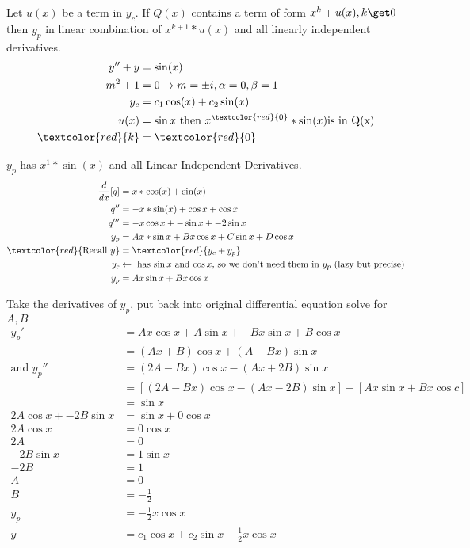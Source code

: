 \begin{case}
Let $u(x)$ be a term in $y_c$. If $Q(x)$ contains a term of form $x^k+u(x), k\get 0$ then $y_p$ in linear combination of $x^{k+1} * u(x)$ and all linearly independent derivatives.
\begin{align*}
    y''+y&=\sin (x)\\
    m^2+1&=0 \rightarrow m=\pm i, \alpha =0, \beta =1\\
    y_c&= c_1 \cos (x) + c_2 \sin(x)\\
    u(x)&= \sin x \text{ then } x^\textcolor{red}{0}*\sin (x) \text{is in Q(x)}\\
    \textcolor{red}{k}&= \textcolor{red}{0}
    \end{align*}
\begin{step} $y_p$ has $x^1*\sin (x)$ and all Linear Independent Derivatives.
    \begin{align*}
    \frac{d}{dx} [q]&= x*\cos (x) +  \sin (x)\\
    q''&= -x*\sin (x)+ \cos x + \cos x\\
    q'''&= -x\cos x + - \sin x +-2 \sin x\\
    y_p&= Ax * \sin x +B x \cos x +C \sin x + D \cos x\\
    \textcolor{red}{\text{Recall }y}&=\textcolor{red}{y_c+y_p}\\
    y_c &\leftarrow\text{ has $\sin x$ and $\cos x$, so we don't need them in $y_p$ (lazy but precise)}\\
    y_p&=Ax\sin x +Bx\cos x
    \end{align*}
\end{step}
\begin{step} Take the derivatives of $y_p$, put back into original differential equation solve for $A,B$
    \begin{align*}
    y_p'&= Ax\cos x+A\sin x+-Bx\sin x+B\cos x\\
    &= (Ax+B)\cos x+(A-Bx) \sin x\\
    \text{and } y_p''&= (2A-Bx)\cos x - (Ax+2B)\sin x\\
    &= [(2A-Bx)\cos x - (Ax-2B)\sin x] + [Ax\sin x +Bx\cos c]\\
    &= \sin x\\
    2A\cos x + -2B\sin x &= \sin x + 0\cos x\\
    2A\cos x &= 0\cos x\\
    2A&= 0\\
    -2B\sin x&= 1\sin x\\
    -2B&=1\\
    A&=0\\
    B&= -\frac{1}{2}\\
    y_p&= -\frac{1}{2}x\cos x\\
    y&= c_1\cos x+c_2 \sin x -\frac{1}{2}x \cos x
\end{align*}
    
\end{step}
\end{case}

